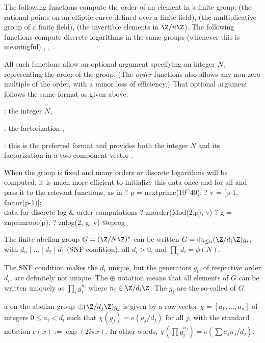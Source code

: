 The following functions compute the order of an element in a finite group:
 (the rational points on an elliptic curve defined over a
finite field),  (the multiplicative group of a finite field),
 (the invertible elements in $\Z/n\Z$). The following functions
compute discrete logarithms in the same groups (whenever this is meaningful)
, , .

All such functions allow an optional argument specifying an integer
$N$, representing the order of the group. (The \emph{order} functions also
allows any non-zero multiple of the order, with a minor loss of efficiency.)
That optional argument follows the same format as given above:

\item {}: the integer $N$,

\item {}: the factorization ,

\item {}: this is the preferred format and provides both the
integer $N$ and its factorization in a two-component vector
\kbd{[$N$, fa]}.

When the group is fixed and many orders or discrete logarithms will be
computed, it is much more efficient to initialize this data once and for all
and pass it to the relevant functions, as in
\bprog
? p = nextprime(10^40);
? v = [p-1, factor(p-1)]; \\ data for discrete log & order computations
? znorder(Mod(2,p), v)
? g = znprimroot(p);
? znlog(2, g, v)
@eprog

\label{se:dirichletchar}

The finite abelian group $G = (\Z/N\Z)^*$ can be written $G = \oplus_{i\leq
n} (\Z/d_i\Z) g_i$, with $d_n \mid \dots \mid d_2 \mid d_1$ (SNF condition),
all $d_i > 0$, and $\prod_i d_i = \phi(N)$.

The SNF condition makes the $d_i$ unique, but the generators $g_i$, of
respective order $d_i$, are definitely not unique. The $\oplus$ notation
means that all elements of $G$ can be written uniquely as $\prod_i g_i^{n_i}$
where $n_i \in \Z/d_i\Z$. The $g_i$ are the so-called 
of $G$.

\item a  on the abelian group
$\oplus (\Z/d_j\Z) g_j$
is given by a row vector $\chi = [a_1,\ldots,a_n]$ of integers $0\leq a_i  <
d_i$ such that $\chi(g_j) = e(a_j / d_j)$ for all $j$, with the standard
notation $e(x) := \exp(2i\pi x)$.
In other words,
$\chi(\prod g_j^{n_j}) = e(\sum a_j n_j / d_j)$.

